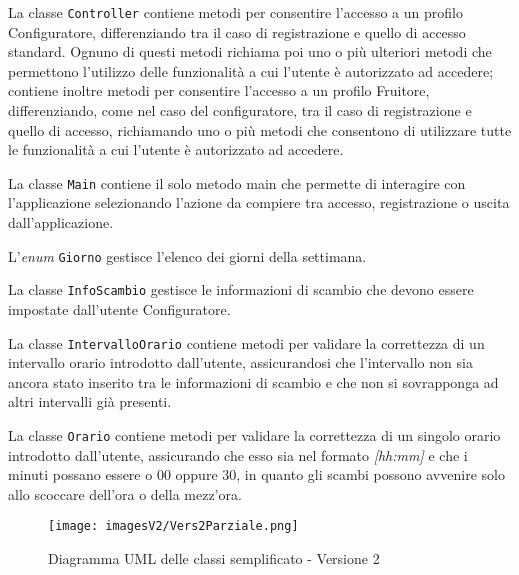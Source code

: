 La classe \texttt{Controller} contiene metodi per consentire l'accesso a un profilo Configuratore, differenziando tra il caso di registrazione e quello di accesso standard. Ognuno di questi metodi richiama poi uno o più ulteriori metodi che permettono l'utilizzo delle funzionalità a cui l'utente è autorizzato ad accedere; contiene inoltre metodi per consentire l'accesso a un profilo Fruitore, differenziando, come nel caso del configuratore, tra il caso di registrazione e quello di accesso, richiamando uno o più metodi che consentono di utilizzare tutte le funzionalità a cui l'utente è autorizzato ad accedere.

La classe \texttt{Main} contiene il solo metodo main che permette di interagire con l'applicazione selezionando l'azione da compiere tra accesso, registrazione o uscita dall'applicazione.

L'\textit{enum} \texttt{Giorno} gestisce l'elenco dei giorni della settimana.

La classe \texttt{InfoScambio} gestisce le informazioni di scambio che devono essere impostate dall'utente Configuratore.

La classe \texttt{IntervalloOrario} contiene metodi per validare la correttezza di un intervallo orario introdotto dall'utente, assicurandosi che l'intervallo non sia ancora stato inserito tra le informazioni di scambio e che non si sovrapponga ad altri intervalli già presenti.

La classe \texttt{Orario} contiene metodi per validare la correttezza di un singolo orario introdotto dall'utente, assicurando che esso sia nel formato \textit{[hh:mm]} e che i minuti possano essere o 00 oppure 30, in quanto gli scambi possono avvenire solo allo scoccare dell'ora o della mezz'ora.

\begin{figure}[h!]
    \centering
    \texttt{[image: imagesV2/Vers2Parziale.png]}
    \caption{\label{fig:Simplified Class Diagram - v2}Diagramma UML delle classi semplificato - Versione 2}
\end{figure}
\bigskip